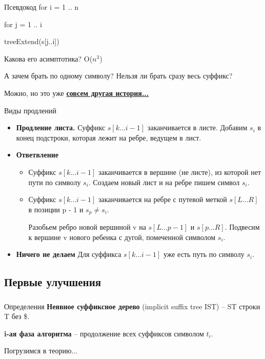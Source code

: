 \documentclass[t]{beamer}  %
\begin{document}
\begin{frame}
	\begin{block}{Псевдокод}
		for i = 1 .. n
		
		\qquad for j = 1 .. i
				
		\qquad \qquad treeExtend(s[j..i]) 
	\end{block}
	
	\pause
	Какова его асимптотика? \pause
	O($n^{3}$) \pause
	
	А зачем брать по одному символу? Нельзя ли брать сразу весь суффикс? \pause
	
	Можно, но это уже \href{http://wind.in.tum.de/seminare/textalgo/WS0203/Izamski.pdf}{ \textbf{совсем другая история...}}
	
\end{frame}

\begin{frame}{Виды продлений}
	\begin{itemize}
		\pause
		\item {\textbf{Продление листа.} Суффикс $s[k...i-1]$ заканчивается в листе. Добавим $s_{i}$ в конец подстроки, которая лежит на ребре, ведущем в лист.}
		
		\pause
		\item \textbf{Ответвление}
		\begin{itemize}
			\pause
			\item{ Суффикс $s[k...i-1]$ заканчивается в вершине (не листе), из которой нет пути по символу $s_{i}$. Создаем новый лист и на ребре пишем символ $s_{i}$.}
			
			\pause
			\item {Суффикс $s[k...i-1]$ заканчивается на ребре с путевой меткой $s[L...R]$ в позиции p - 1 и $s_{p} \neq  s_{i}$. 
				
				Разобьем ребро новой вершиной v на $s[L...p-1]$ и $s[p...R]$. Подвесим к вершине v нового ребенка с дугой, помеченной символом $s_{i}$. } 
			
		\end{itemize}
		\pause
		\item {\textbf{Ничего не делаем} Для суффикса $s[k...i-1]$ уже есть путь по символу $s_{i}$.} 
	\end{itemize}
\end{frame}

\subsection{Первые улучшения}
\begin{frame}
	\frametitle{\insertsubsection}
	
	\begin{block}{Определения}
		\textbf{Неявное суффиксное дерево} (implicit suffix tree IST) -- ST строки T без \$.
	\end{block}
	\pause
	
	\textbf{i-ая фаза алгоритма} -- продолжение всех суффиксов символом $t_{i}$.
	\pause
	
	Погрузимся в теорию...
\end{frame}
\end{document}
